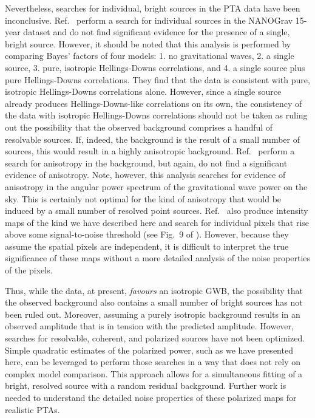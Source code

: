 \documentclass[%
 reprint,
nofootinbib,
 amsmath,amssymb,
 aps,
]{revtex4-2}
\begin{document}
Nevertheless, searches for individual, bright sources in the PTA data have been inconclusive. Ref.~\cite{NANOGrav_CW} perform a search for individual sources in the NANOGrav 15-year dataset and do not find significant evidence for the presence of a single, bright source. However, it should be noted that this analysis is performed by comparing Bayes' factors of four models: 1. no gravitational waves, 2. a single source, 3. pure, isotropic Hellings-Downs correlations, and 4. a single source plus pure Hellings-Downs correlations. They find that the data is consistent with pure, isotropic Hellings-Downs correlations alone. However, since a single source already produces Hellings-Downs-like correlations on its own, the consistency of the data with isotropic Hellings-Downs correlations should not be taken as ruling out the possibility that the observed background comprises a handful of resolvable sources. If, indeed, the background is the result of a small number of sources, this would result in a highly anisotropic background. Ref.~\cite{Nanograv2023Anisotropy} perform a search for anisotropy in the background, but again, do not find a significant evidence of anisotropy. Note, however, this analysis searches for evidence of anisotropy in the angular power spectrum of the gravitational wave power on the sky. This is certainly not optimal for the kind of anisotropy that would be induced by a small number of resolved point sources. Ref.~\cite{Nanograv2023Anisotropy} also produce intensity maps of the kind we have described here and search for individual pixels that rise above some signal-to-noise threshold (see Fig.~9 of \cite{Nanograv2023Anisotropy}). However, because they assume the spatial pixels are independent, it is difficult to interpret the true significance of these maps without a more detailed analysis of the noise properties of the pixels. 

Thus, while the data, at present, \textit{favours} an isotropic GWB, the possibility that the observed background also contains a small number of bright sources has not been ruled out. Moreover, assuming a purely isotropic background results in an observed amplitude that is in tension with the predicted amplitude. However, searches for resolvable, coherent, and polarized sources have not been optimized. Simple quadratic estimates of the polarized power, such as we have presented here, can be leveraged to perform those searches in a way that does not rely on complex model comparison. This approach allows for a simultaneous fitting of a bright, resolved source with a random residual background\citep{2003ApJ...591..575M}. Further work is needed to understand the detailed noise properties of these polarized maps for realistic PTAs.
\end{document}
